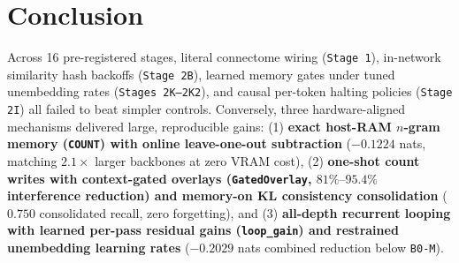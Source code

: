\documentclass[11pt,a4paper]{article}
\begin{document}
\section{Conclusion}

Across 16 pre-registered stages, literal connectome wiring (\texttt{Stage 1}), in-network similarity hash backoffs (\texttt{Stage 2B}), learned memory gates under tuned unembedding rates (\texttt{Stages 2K--2K2}), and causal per-token halting policies (\texttt{Stage 2I}) all failed to beat simpler controls. Conversely, three hardware-aligned mechanisms delivered large, reproducible gains: (1) \textbf{exact host-RAM $n$-gram memory (\texttt{COUNT}) with online leave-one-out subtraction} ($-0.1224$ nats, matching $2.1\times$ larger backbones at zero VRAM cost), (2) \textbf{one-shot count writes with context-gated overlays (\texttt{GatedOverlay}, $81\%\text{--}95.4\%$ interference reduction) and memory-on KL consistency consolidation} ($0.750$ consolidated recall, zero forgetting), and (3) \textbf{all-depth recurrent looping with learned per-pass residual gains (\texttt{loop\_gain}) and restrained unembedding learning rates} ($-0.2029$ nats combined reduction below \texttt{B0-M}).
\end{document}
